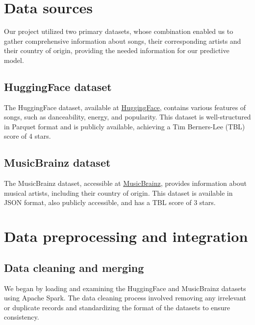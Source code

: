 \documentclass{article}
\begin{document}
\section{Data sources}
Our project utilized two primary datasets, whose combination enabled us to gather comprehensive information about songs, their corresponding artists and their country of origin, providing the needed information for our predictive model.

\subsection{HuggingFace dataset}
The HuggingFace dataset, available at \href{https://huggingface.co/datasets/maharshipandya/spotify-tracks-dataset}{HuggingFace}, contains various features of songs, such as danceability, energy, and popularity. This dataset is well-structured in Parquet format and is publicly available, achieving a Tim Berners-Lee (TBL) score of 4 stars.

\subsection{MusicBrainz dataset}
The MusicBrainz dataset, accessible at \href{https://data.metabrainz.org/pub/musicbrainz/data/json-dumps/20240608-001001/}{MusicBrainz}, provides information about musical artists, including their country of origin. This dataset is available in JSON format, also publicly accessible, and has a TBL score of 3 stars.
\section{Data preprocessing and integration}

\subsection{Data cleaning and merging}
We began by loading and examining the HuggingFace and MusicBrainz datasets using Apache Spark. The data cleaning process involved removing any irrelevant or duplicate records and standardizing the format of the datasets to ensure consistency. 
\end{document}
